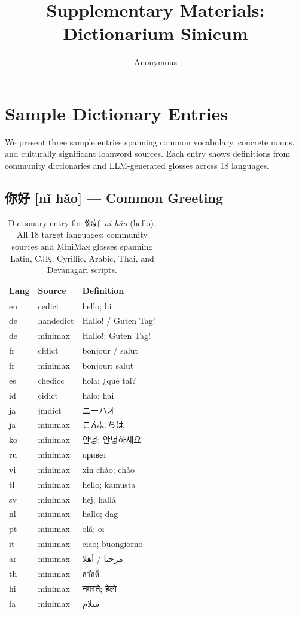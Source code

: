\documentclass[11pt,a4paper]{article}
\title{Supplementary Materials:\\Dictionarium Sinicum}
\author{Anonymous}
\newcommand{\ru}[1]{{\cyrfont #1}}
\newcommand{\ar}[1]{\foreignlanguage{arabic}{#1}}
\newcommand{\hi}[1]{\foreignlanguage{hindi}{#1}}
\newcommand{\thi}[1]{\foreignlanguage{thai}{#1}}
\begin{document}
\maketitle

\section{Sample Dictionary Entries}

We present three sample entries spanning common vocabulary, concrete nouns, and culturally significant loanword sources.
Each entry shows definitions from community dictionaries and LLM-generated glosses across 18 languages.

\subsection{你好 [nǐ hǎo] --- Common Greeting}

\begin{table}[H]
\centering
\footnotesize
\begin{tabular}{llp{3.6cm}}
\toprule
\textbf{Lang} & \textbf{Source} & \textbf{Definition} \\
\midrule
en & cedict & hello; hi \\
de & handedict & Hallo! / Guten Tag! \\
de & minimax & Hallo!; Guten Tag! \\
fr & cfdict & bonjour / salut \\
fr & minimax & bonjour; salut \\
es & chedicc & hola; ¿qué tal? \\
id & cidict & halo; hai \\
ja & jmdict & ニーハオ \\
ja & minimax & こんにちは \\
ko & minimax & 안녕; 안녕하세요 \\
ru & minimax & \ru{привет} \\
vi & minimax & xin chào; chào \\
tl & minimax & hello; kamusta \\
sv & minimax & hej; hallå \\
nl & minimax & hallo; dag \\
pt & minimax & olá; oi \\
it & minimax & ciao; buongiorno \\
ar & minimax & \ar{مرحبا} / \ar{أهلا} \\
th & minimax & \thi{สวัสดี} \\
hi & minimax & \hi{नमस्ते}; \hi{हेलो} \\
fa & minimax & \ar{سلام} \\
\bottomrule
\end{tabular}
\caption{Dictionary entry for 你好 \textit{nǐ hǎo} (hello). All 18 target languages: community sources and MiniMax glosses spanning Latin, CJK, Cyrillic, Arabic, Thai, and Devanagari scripts.}
\label{tab:nihao}
\end{table}
\end{document}
